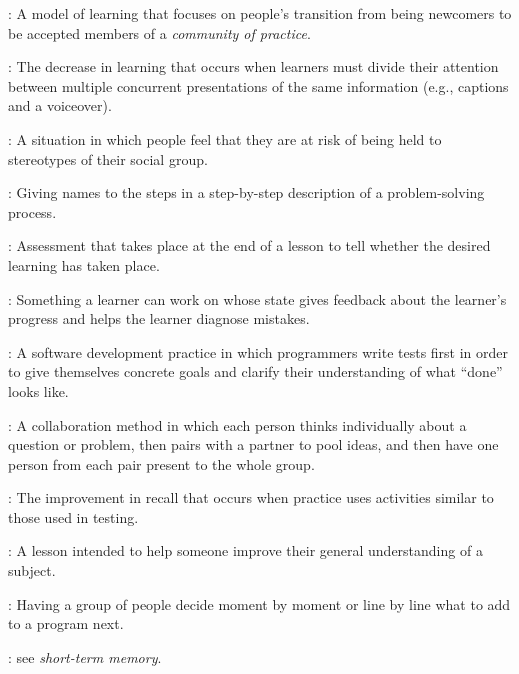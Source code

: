 \begin{description}
: A model of learning that focuses
on people's transition from being newcomers to be accepted members of a
\emph{community of practice}.

: The decrease in
learning that occurs when learners must divide their attention between multiple
concurrent presentations of the same information (e.g., captions and a
voiceover).

: A situation in which people feel
that they are at risk of being held to stereotypes of their social group.

: Giving names to the steps in a
step-by-step description of a problem-solving process.

: Assessment that takes
place at the end of a lesson to tell whether the desired learning has taken
place.

: Something a learner can work on
whose state gives feedback about the learner's progress and helps the learner
diagnose mistakes.

: A software
development practice in which programmers write tests first in order to give
themselves concrete goals and clarify their understanding of what ``done'' looks
like.

: A collaboration method in which
each person thinks individually about a question or problem, then pairs with a
partner to pool ideas, and then have one person from each pair present to the
whole group.

: The
improvement in recall that occurs when practice uses activities similar to those
used in testing.

: A lesson intended to help someone improve their
general understanding of a subject.

: Having a group of people decide moment
by moment or line by line what to add to a program next.

: see \emph{short-term memory}.

\end{description}
